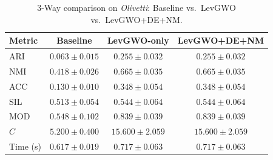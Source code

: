 \begin{table}[htbp]
\centering
\caption{3-Way comparison on \textit{Olivetti}: Baseline vs.\ LevGWO vs.\ LevGWO+DE+NM.}
\label{tab:olivetti_3way}
\begin{tabular}{lccc}
\toprule
Metric & Baseline & LevGWO-only & LevGWO+DE+NM \\
\midrule
ARI & $0.063 \pm 0.015$ & $\mathbf{0.255 \pm 0.032}$ & $\mathbf{0.255 \pm 0.032}$ \\
NMI & $0.418 \pm 0.026$ & $\mathbf{0.665 \pm 0.035}$ & $\mathbf{0.665 \pm 0.035}$ \\
ACC & $0.130 \pm 0.010$ & $\mathbf{0.348 \pm 0.054}$ & $\mathbf{0.348 \pm 0.054}$ \\
SIL & $0.513 \pm 0.054$ & $\mathbf{0.544 \pm 0.064}$ & $\mathbf{0.544 \pm 0.064}$ \\
MOD & $0.548 \pm 0.102$ & $\mathbf{0.839 \pm 0.039}$ & $\mathbf{0.839 \pm 0.039}$ \\
$C$ & $5.200 \pm 0.400$ & $15.600 \pm 2.059$ & $15.600 \pm 2.059$ \\
Time (s) & $0.617 \pm 0.019$ & $0.717 \pm 0.063$ & $0.717 \pm 0.063$ \\
\bottomrule
\end{tabular}
\end{table}